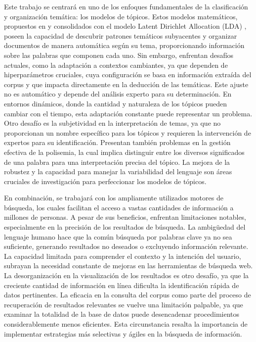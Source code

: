 Este trabajo se centrará en uno de los enfoques fundamentales de la clasificación y organización temática: los modelos de tópicos. Estos modelos matemáticos, propuestos en  y consolidados con el modelo Latent Dirichlet Allocation (LDA) , poseen la capacidad de descubrir patrones temáticos subyacentes y organizar documentos de manera automática según su tema, proporcionando información sobre las palabras que componen cada uno. 
Sin embargo, enfrentan desafíos actuales, como la adaptación a contextos cambiantes, ya que dependen de hiperparámetros cruciales, cuya configuración se basa en información extraída del corpus
y que impacta directamente en la deducción de las temáticas. Este ajuste no es automático y depende del análisis experto para su determinaci\'on. En entornos dinámicos, donde la cantidad y naturaleza de los tópicos pueden cambiar con el tiempo, esta adaptación constante puede representar un problema. 
Otro desaf\'io es la subjetividad en la interpretación de temas, ya que no proporcionan un nombre específico para los t\'opicos y requieren la intervención de expertos para su identificación.
Presentan tambi\'en problemas en la gestión efectiva de la polisemia, la cual implica distinguir entre los diversos significados de una palabra para una interpretación precisa del tópico. La mejora de la robustez y la capacidad para manejar la variabilidad del lenguaje son áreas cruciales de investigación para perfeccionar los modelos de t\'opicos. 

En combinaci\'on, se trabajar\'a con los ampliamente utilizados motores de b\'usqueda, los cuales facilitan el acceso a vastas cantidades de información a millones de personas. A pesar de sus beneficios, enfrentan limitaciones notables, especialmente en la precisión de los resultados de b\'usqueda. La ambigüedad del lenguaje humano hace que la com\'un b\'usqueda por palabras clave ya no sea suficiente, generando resultados no deseados o excluyendo información relevante. La capacidad limitada para comprender el contexto y la intención del usuario, subrayan la necesidad constante de mejoras en las herramientas de búsqueda web. La desorganización en la visualización de los resultados es otro desafío, ya que la creciente cantidad de información en línea dificulta la identificación rápida de datos pertinentes. La eficacia en la consulta del corpus como parte del proceso de recuperación de resultados relevantes se vuelve una limitación palpable, ya que examinar la totalidad de la base de datos puede desencadenar procedimientos considerablemente menos eficientes. Esta circunstancia resalta la importancia de implementar estrategias más selectivas y ágiles en la búsqueda de información. 

